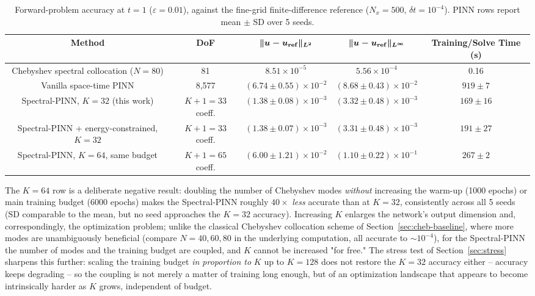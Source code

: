 \documentclass[symmetry,article,submit,moreauthors]{Definitions/mdpi}
\begin{document}
\begin{table}[H]
\caption{Forward-problem accuracy at $t=1$ ($\varepsilon=0.01$), against the fine-grid finite-difference reference ($N_x=500$, $\delta t=10^{-4}$). PINN rows report mean $\pm$ SD over 5 seeds.\label{tab:forward}}
\begin{tabularx}{\textwidth}{CCCCC}
\toprule
\textbf{Method} & \textbf{DoF} & $\boldsymbol{\|u-u_{\rm ref}\|_{L^2}}$ & $\boldsymbol{\|u-u_{\rm ref}\|_{L^\infty}}$ & \textbf{Training/Solve Time (s)}\\
\midrule
Chebyshev spectral collocation ($N=80$) & 81 & $8.51\times10^{-5}$ & $5.56\times10^{-4}$ & 0.16\\
Vanilla space-time PINN & 8{,}577 & $(6.74\pm0.55)\times10^{-2}$ & $(8.68\pm0.43)\times10^{-2}$ & $919\pm7$\\
Spectral-PINN, $K=32$ (this work) & $K{+}1=33$ coeff. & $(1.38\pm0.08)\times10^{-3}$ & $(3.32\pm0.48)\times10^{-3}$ & $169\pm16$\\
Spectral-PINN + energy-constrained, $K=32$ & $K{+}1=33$ coeff. & $(1.38\pm0.07)\times10^{-3}$ & $(3.31\pm0.48)\times10^{-3}$ & $191\pm27$\\
Spectral-PINN, $K=64$, same budget & $K{+}1=65$ coeff. & $(6.00\pm1.21)\times10^{-2}$ & $(1.10\pm0.22)\times10^{-1}$ & $267\pm2$\\
\bottomrule
\end{tabularx}
\end{table}

The $K=64$ row is a deliberate negative result: doubling the number of Chebyshev modes \emph{without} increasing the warm-up (1000 epochs) or main training budget (6000 epochs) makes the Spectral-PINN roughly $40\times$ \emph{less} accurate than at $K=32$, consistently across all 5 seeds (SD comparable to the mean, but no seed approaches the $K=32$ accuracy). Increasing $K$ enlarges the network's output dimension and, correspondingly, the optimization problem; unlike the classical Chebyshev collocation scheme of Section~\ref{sec:cheb-baseline}, where more modes are unambiguously beneficial (compare $N=40,60,80$ in the underlying computation, all accurate to $\sim10^{-4}$), for the Spectral-PINN the number of modes and the training budget are coupled, and $K$ cannot be increased "for free." The stress test of Section~\ref{sec:stress} sharpens this further: scaling the training budget \emph{in proportion to} $K$ up to $K=128$ does not restore the $K=32$ accuracy either -- accuracy keeps degrading -- so the coupling is not merely a matter of training long enough, but of an optimization landscape that appears to become intrinsically harder as $K$ grows, independent of budget.
\end{document}
